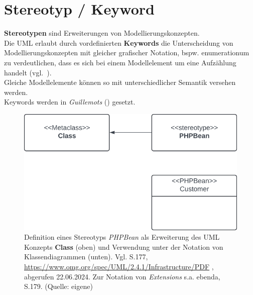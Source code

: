 \section{Stereotyp / Keyword}

\begin{tcolorbox}[title=Konzept der Stereotypen]
    \textbf{Stereotypen} sind Erweiterungen von Modellierungskonzepten.\\

    \noindent
    Die UML erlaubt durch vordefinierten \textbf{Keywords} die Unterscheidung von Modellierungskonzepten mit gleicher grafischer Notation,  bspw. \guillemotleft enumeration\guillemotright um zu verdeutlichen, dass es sich bei einem Modellelement um eine Aufzählung handelt (vgl.~\cite[28]{Bal05}).\\
    Gleiche Modellelemente können so mit unterschiedlicher Semantik versehen werden.\\
    Keywords werden in \textit{Guillemots} (\guillemotleft \guillemotright) gesetzt.\\

\end{tcolorbox}


\begin{figure}
    \centering
    \includegraphics[scale=0.4]{chapters/Anhang/CheatSheets/SE3/img/stereotyp}
    \caption{
        Definition eines Stereotyps \textit{PHPBean} als Erweiterung des UML Konzepts \textbf{Class} (oben) und Verwendung unter der Notation von Klassendiagrammen (unten).
        Vgl. S.177, \url{https://www.omg.org/spec/UML/2.4.1/Infrastructure/PDF} , abgerufen 22.06.2024. Zur Notation von \textit{Extensions} s.a. ebenda, S.179.
        (Quelle: eigene)
    }
\end{figure}



